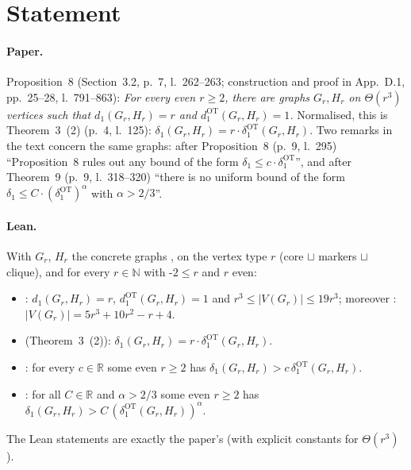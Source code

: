 

\paperversion

\section{Statement}

\paragraph{Paper.} Proposition~8 (Section~3.2, p.~7, l.~262--263; construction and proof in App.~D.1,
pp.~25--28, l.~791--863): \emph{For every even $r\ge2$, there are graphs $G_r,H_r$ on $\Theta(r^3)$ vertices
such that $d_1(G_r,H_r)=r$ and $d^{\mathrm{OT}}_1(G_r,H_r)=1$.} Normalised, this is Theorem~3~(2) (p.~4,
l.~125): $\delta_1(G_r,H_r)=r\cdot\delta_1^{\mathrm{OT}}(G_r,H_r)$. Two remarks in the text concern the same
graphs: after Proposition~8 (p.~9, l.~295) ``Proposition~8 rules out any bound of the form
$\delta_1\le c\cdot\delta_1^{\mathrm{OT}}$'', and after Theorem~9 (p.~9, l.~318--320) ``there is no uniform
bound of the form $\delta_1\le C\cdot(\delta_1^{\mathrm{OT}})^\alpha$ with $\alpha>2/3$''.

\paragraph{Lean.} With $G_r$, $H_r$ the concrete graphs ,  on the
vertex type  $r$ (core $\sqcup$ markers $\sqcup$ clique), and for every $r\in\mathbb N$ with
\hyp{$2\le r$ and $r$ even}:
\begin{itemize}
\item {}: $d_1(G_r,H_r)=r$, $d_1^{\mathrm{OT}}(G_r,H_r)=1$ and
  $r^3\le|V(G_r)|\le19r^3$; moreover : $|V(G_r)|=5r^3+10r^2-r+4$.
\item {} (Theorem~3~(2)): $\delta_1(G_r,H_r)=r\cdot\delta_1^{\mathrm{OT}}(G_r,H_r)$.
\item {}: for every $c\in\mathbb R$ some even $r\ge2$ has
  $\delta_1(G_r,H_r)>c\,\delta_1^{\mathrm{OT}}(G_r,H_r)$.
\item {}: for all $C\in\mathbb R$ and $\alpha>2/3$ some even $r\ge2$ has
  $\delta_1(G_r,H_r)>C\,(\delta_1^{\mathrm{OT}}(G_r,H_r))^\alpha$.
\end{itemize}
The Lean statements are exactly the paper's (with explicit constants for $\Theta(r^3)$).

